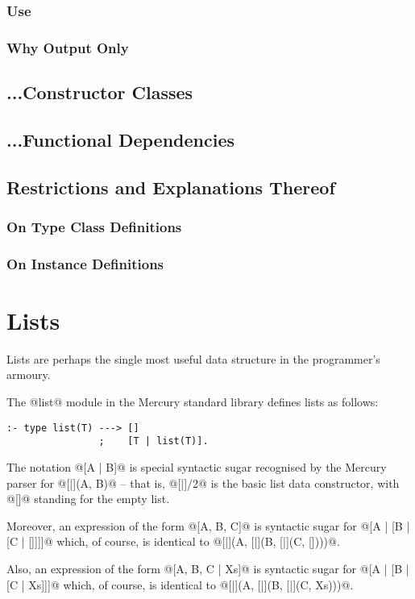\documentclass[a4paper,11pt,notitlepage,onecolumn]{article}
\begin{document}
\subsubsection{Use}
\subsubsection{Why Output Only}
\subsection{...Constructor Classes}
\subsection{...Functional Dependencies}
\subsection{Restrictions and Explanations Thereof}
\subsubsection{On Type Class Definitions}
\subsubsection{On Instance Definitions}



\section{Lists}

Lists are perhaps the single most useful data structure in the
programmer's armoury.

The @list@ module in the Mercury standard library defines lists as
follows:
\begin{verbatim}
:- type list(T) ---> []
                ;    [T | list(T)].
\end{verbatim}
The notation @[A | B]@ is special syntactic sugar recognised by the
Mercury parser for @[|](A, B)@ -- that is, @[|]/2@ is the basic list
data constructor, with @[]@ standing for the empty list.

Moreover, an expression of the form @[A, B, C]@ is syntactic sugar for
@[A | [B | [C | []]]]@ which, of course, is identical to
@[|](A, [|](B, [|](C, [])))@.

Also, an expression of the form @[A, B, C | Xs]@ is syntactic sugar for
@[A | [B | [C | Xs]]]@ which, of course, is identical to
@[|](A, [|](B, [|](C, Xs)))@.
\end{document}

